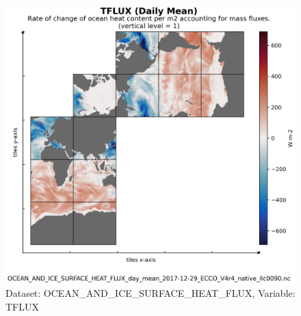 \begin{figure}[H]
\centering
\includegraphics[scale=0.55]{../images/plots/v4r4/native_plots/Ocean_and_Sea-Ice_Surface_Heat_Fluxes/TFLUX.png}
\caption{Dataset: OCEAN\_AND\_ICE\_SURFACE\_HEAT\_FLUX, Variable: TFLUX}
\label{tab:table-OCEAN_AND_ICE_SURFACE_HEAT_FLUX_TFLUX-Plot}
\end{figure}
\newpage
\pagebreak

